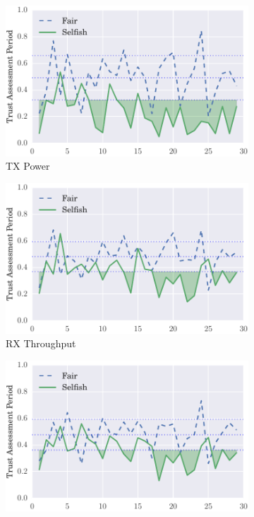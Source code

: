 \documentclass[runningheads,a4paper]{llncs}
\begin{document}
\begin{figure}
\begin{subfigure}{0.32\textwidth}
  \includegraphics[width=.95\linewidth]{img/trust_bella_single_mobile_emph_ATXP_BadMouthingPowerControl.pdf}
  \caption{TX Power}
  \label{fig:single_mobile_badmouthing_txp}
\end{subfigure}
\begin{subfigure}{0.32\textwidth}
\centering
  \includegraphics[width=.95\linewidth]{img/trust_bella_single_mobile_emph_RXThroughput_BadMouthingPowerControl.pdf}
  \caption{RX Throughput}
  \label{fig:single_mobile_badmouthing_rxthroughput}
\end{subfigure}
\begin{subfigure}{0.32\textwidth}
\centering
  \includegraphics[width=.95\linewidth]{img/trust_bella_single_mobile_emph_TXThroughput_BadMouthingPowerControl.pdf}

\end{subfigure}
\end{figure}
\end{document}
